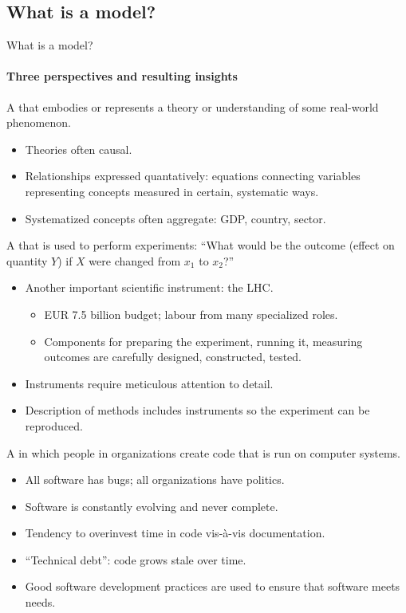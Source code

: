 \documentclass[12pt,aspectratio=169]{beamer}
\begin{document}
\subsection{What is a model?}
\begin{frame}[allowframebreaks]{What is a model?}
\framesubtitle{Three perspectives and resulting insights}

A  that embodies or represents a theory or understanding of some real-world phenomenon.

\begin{itemize}
  \item Theories often causal.
  \item Relationships expressed quantatively: equations connecting variables representing concepts measured in certain, systematic ways.
  \item Systematized concepts often aggregate: GDP, country, sector.
\end{itemize}

\framebreak
A  that is used to perform experiments: “What would be the outcome (effect on quantity $Y$) if $X$ were changed from $x_1$ to $x_2$?”

\begin{itemize}
  \item Another important scientific instrument: the LHC.
    \begin{itemize}
      \item EUR 7.5 billion budget; labour from many specialized roles.
      \item Components for preparing the experiment, running it, measuring outcomes are carefully designed, constructed, tested.
    \end{itemize}
  \item Instruments require meticulous attention to detail.
  \item Description of methods includes instruments so the experiment can be reproduced.
\end{itemize}

\framebreak
A  in which people in organizations create code that is run on computer systems.

\begin{itemize}
  \item All software has bugs; all organizations have politics.
  \item Software is constantly evolving and never complete.
  \item Tendency to overinvest time in code vis-à-vis documentation.
  \item “Technical debt”: code grows stale over time.
  \item Good software development practices are used to ensure that software meets needs.
\end{itemize}

\end{frame}
\end{document}
